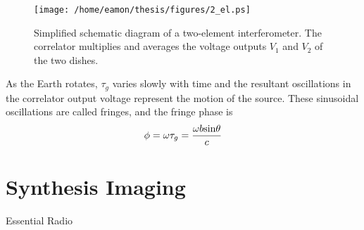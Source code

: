 \begin{figure}[hbt!]
\centering 
          \texttt{[image: /home/eamon/thesis/figures/2\_el.ps]}
\caption[Simplified schematic diagram of a two-element interferometer.]{Simplified schematic diagram of a two-element interferometer. The correlator multiplies and averages the voltage outputs $V_1$ and $V_2$ of the two dishes.}
\label{fig2g}
\end{figure}

As the Earth rotates, $\tau _g$ varies slowly with time and the resultant oscillations in the correlator output voltage represent the motion of the source. These sinusoidal oscillations are called fringes, and the fringe phase is 
\begin{equation}
\phi = \omega \tau _g = \frac{\omega b\rm{sin} \theta}{c}
\end{equation}
\section{Synthesis Imaging}\label{sec:4}
Essential Radio 